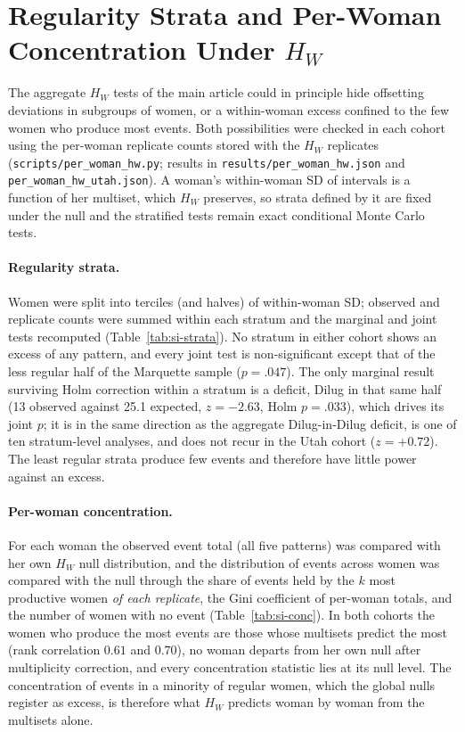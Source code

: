 \documentclass[12pt]{article}
\newcommand{\HW}{H_{W}}
\begin{document}
\section{Regularity Strata and Per-Woman Concentration Under \texorpdfstring{$\HW$}{HW}}
\label{sec:si-perwoman}

The aggregate $\HW$ tests of the main article could in principle hide offsetting
deviations in subgroups of women, or a within-woman excess confined to the few women who
produce most events. Both possibilities were checked in each cohort using the per-woman
replicate counts stored with the $\HW$ replicates (\texttt{scripts/per\_woman\_hw.py};
results in \texttt{results/per\_woman\_hw.json} and \texttt{per\_woman\_hw\_utah.json}).
A woman's within-woman SD of intervals is a function of her multiset, which $\HW$
preserves, so strata defined by it are fixed under the null and the stratified tests
remain exact conditional Monte Carlo tests.

\paragraph{Regularity strata.} Women were split into terciles (and halves) of
within-woman SD; observed and replicate counts were summed within each stratum and the
marginal and joint tests recomputed (Table~\ref{tab:si-strata}). No stratum in either
cohort shows an excess of any pattern, and every joint test is non-significant except
that of the less regular half of the Marquette sample ($p = .047$). The only marginal
result surviving Holm correction within a stratum is a deficit, Dilug in that same half
(13 observed against 25.1 expected, $z = -2.63$, Holm $p = .033$), which drives its joint
$p$; it is in the same
direction as the aggregate Dilug-in-Dilug deficit, is one of ten stratum-level analyses,
and does not recur in the Utah cohort ($z = +0.72$). The least regular strata produce few
events and therefore have little power against an excess.

\paragraph{Per-woman concentration.} For each woman the observed event total (all five
patterns) was compared with her own $\HW$ null distribution, and the distribution of
events across women was compared with the null through the share of events held by the
$k$ most productive women \emph{of each replicate}, the Gini coefficient of per-woman
totals, and the number of women with no event (Table~\ref{tab:si-conc}). In both
cohorts the women who produce the most events are those whose multisets predict the
most (rank correlation $0.61$ and $0.70$), no woman departs from her own null after
multiplicity correction, and every concentration statistic lies at its null level. The
concentration of events in a minority of regular women, which the global nulls register
as excess, is therefore what $\HW$ predicts woman by woman from the multisets alone.
\end{document}
